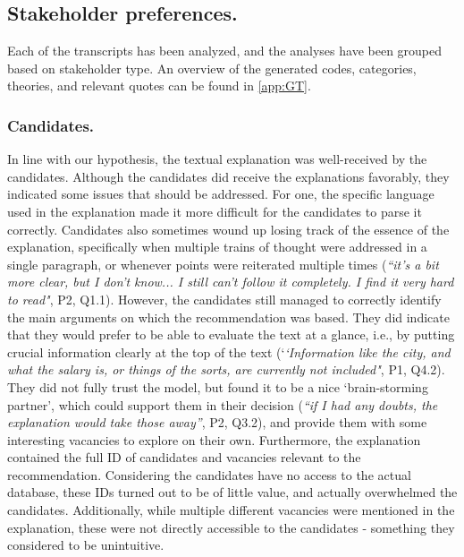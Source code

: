 \subsection{Stakeholder preferences.}
Each of the transcripts has been analyzed, and the analyses have been grouped based on stakeholder type. An overview of the generated codes, categories, theories, and relevant quotes can be found in \cref{app:GT}.

\subsubsection{Candidates.}
In line with our hypothesis, the textual explanation was well-received by the candidates. Although the candidates did receive the explanations favorably, they indicated some issues that should be addressed. For one, the specific language used in the explanation made it more difficult for the candidates to parse it correctly. Candidates also sometimes wound up losing track of the essence of the explanation, specifically when multiple trains of thought were addressed in a single paragraph, or whenever points were reiterated multiple times (\textit{``it's a bit more clear, but I don't know... I still can't follow it completely. I find it very hard to read"}, P2, Q1.1). However, the candidates still managed to correctly identify the main arguments on which the recommendation was based. They did indicate that they would prefer to be able to evaluate the text at a glance, i.e., by putting crucial information clearly at the top of the text (`\textit{`Information like the city, and what the salary is, or things of the sorts, are currently not included"}, P1, Q4.2). They did not fully trust the model, but found it to be a nice `brain-storming partner', which could support them in their decision (\textit{``if I had any doubts, the explanation would take those away''}, P2, Q3.2), and provide them with some interesting vacancies to explore on their own. Furthermore, the explanation contained the full ID of candidates and vacancies relevant to the recommendation. Considering the candidates have no access to the actual database, these IDs turned out to be of little value, and actually overwhelmed the candidates. Additionally, while multiple different vacancies were mentioned in the explanation, these were not directly accessible to the candidates - something they considered to be unintuitive. 


